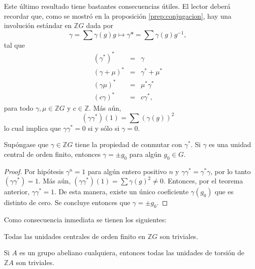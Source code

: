 Este último resultado tiene bastantes consecuencias útiles. El lector deberá recordar que, como se mostró en la proposición \ref{prep:conjugacion}, hay una involución estándar en $\mathds{Z}G$ dada por 
\begin{equation*}
\gamma = \sum\gamma(g)g \mapsto \gamma* = \sum\gamma(g)g^{-1},
\end{equation*}
tal que
\begin{eqnarray*}
(\gamma^*)^* &=& \gamma \\
(\gamma + \mu)^* &=& \gamma^* + \mu^*\\
(\gamma\mu)^* &=& \mu^*\gamma^*\\
(c\gamma)^* &=& c\gamma^*,
\end{eqnarray*}
para todo $\gamma, \mu \in \mathds{Z}G$ y $c \in \mathds{Z}$. Más aún, 
\begin{equation*}
(\gamma\gamma^*)(1) = \sum(\gamma(g))^2
\end{equation*}
lo cual implica que $\gamma\gamma^* = 0 $ si y sólo si $\gamma = 0$.

\begin{corolario}
Supóngase que $\gamma \in \mathds{Z}G$ tiene la propiedad de conmutar con $\gamma^*$. Si $\gamma$ es una unidad central de orden finito, entonces $\gamma = \pm g_0$ para algún $g_0 \in G$.
\end{corolario}
\begin{proof}
Por hipótesis $\gamma^n = 1$ para algún entero positivo $n$ y $\gamma\gamma^* = \gamma^*\gamma$, por lo tanto $(\gamma\gamma^*) = 1$. Más aún, $(\gamma\gamma^*)(1) = \sum \gamma(g)^2 \neq 0$. Entonces, por el teorema anterior, $\gamma\gamma^* = 1$. De esta manera, existe un único coeficiente $\gamma(g_0)$ que es distinto de cero. Se concluye entonces que $\gamma = \pm g_0$. 
\end{proof}
Como consecuencia inmediata se tienen los siguientes:
\begin{corolario}
Todas las unidades centrales de orden finito en $\mathds{Z}G$ son triviales.
\end{corolario}
\begin{corolario}
Si $A$ es un grupo abeliano cualquiera, entonces todas las unidades de torsión de $\mathds{Z}A$ son triviales.
\end{corolario}
